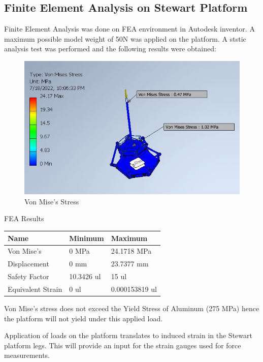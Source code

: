 \subsection{Finite Element Analysis on Stewart Platform}
Finite Element Analysis was done on FEA environment in Autodesk inventor. A maximum possible model weight of 50N was applied on the platform. 
A ststic analysis test was performed and the following results were obtained:
\begin{center}
	\begin{figure}[H]
	\centering
	\includegraphics[width=0.75\linewidth]{Figures/Von}
	\caption[Von Mise's Stress]{Von Mise's Stress}
	\end{figure}
\end{center}
\begin{table}[!h]
\caption{FEA Results}
\end{table}
\begin{center}
\begin{tabular}{|l|l|l|}
\hline
\textbf{Name} & \textbf{Minimum} & \textbf{Maximum}\\
\hline
Von Mise's & 0 MPa & 24.1718 MPa\\
\hline
Displacement & 0 mm & 23.7377 mm\\
\hline
Safety Factor & 10.3426 ul & 15 ul\\
\hline
Equivalent Strain & 0 ul & 0.000153819 ul\\
\hline
\end{tabular}
\end{center}
Von Mise's stress does not exceed the Yield Stress of Aluminum (275 MPa) hence the platform will not yield under this applied load.

Application of loads on the platform translates to induced strain in the Stewart platform legs. This will provide an input for the strain gauges used for force measurements.

